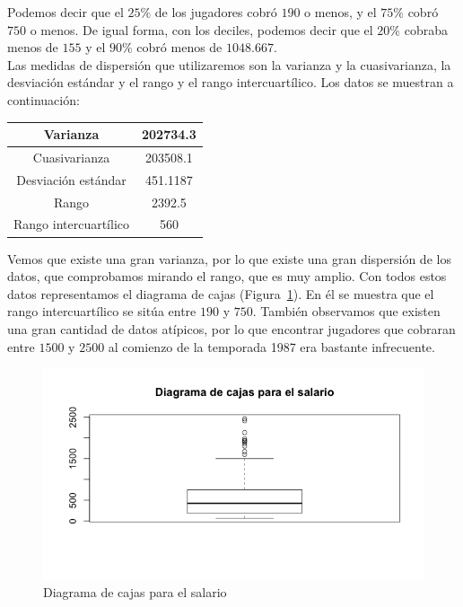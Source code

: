 \documentclass[12pt,a4paper,twoside,openright,titlepage,final]{article}
\begin{document}
Podemos decir que el $25\%$ de los jugadores cobró $190$ o menos, y el $75\%$ cobró $750$ o menos. De igual forma, con los deciles, podemos decir que el $20\%$ cobraba menos de $155$ y el $90\%$ cobró menos de $1048.667$.\\

Las medidas de dispersión que utilizaremos son la varianza y la cuasivarianza, la desviación estándar y el rango y el rango intercuartílico. Los datos se muestran a continuación:

\begin{table}[htbp]
\centering
\begin{tabular}{|c|c|}
\hline Varianza & 202734.3 \\ 
\hline Cuasivarianza & 203508.1 \\
\hline Desviación estándar & 451.1187 \\  
\hline Rango & 2392.5  \\ 
\hline Rango intercuartílico & 560  \\ 
\hline 
\end{tabular} 
\end{table}

Vemos que existe una gran varianza, por lo que existe una gran dispersión de los datos, que comprobamos mirando el rango, que es muy amplio. Con todos estos datos representamos el diagrama de cajas (Figura~\ref{fig:diagrama_cajas_salario}). En él se muestra que el rango intercuartílico se sitúa entre $190$ y $750$. También observamos que existen una gran cantidad de datos atípicos, por lo que encontrar jugadores que cobraran entre $1500$ y $2500$ al comienzo de la temporada 1987 era bastante infrecuente.\\

\begin{figure}[tbph!]
\centering
\includegraphics[width=0.8\linewidth]{imagenes/diagrama_cajas_salario}
\caption{Diagrama de cajas para el salario}
\label{fig:diagrama_cajas_salario}
\end{figure}
\end{document}
